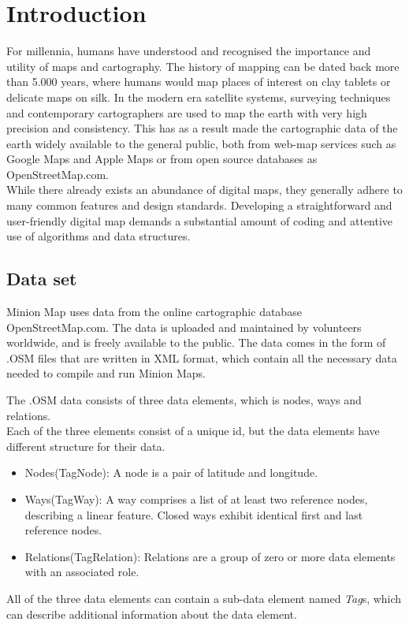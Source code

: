 \section{Introduction}
For millennia, humans have understood and recognised the importance and utility of maps and cartography. The history of mapping can be dated back more than 5.000 years, where humans would map places of interest on clay tablets or delicate maps on silk. In the modern era satellite systems, surveying techniques and contemporary cartographers are used to map the earth with very high precision and consistency. \cite*{littertur/icsm}
This has as a result made the cartographic data of the earth widely available to the general public, both from web-map services such as Google Maps and Apple Maps or from open source databases as OpenStreetMap.com. \\
\linebreak
While there already exists an abundance of digital maps, they generally adhere to many common features and design standards. Developing a straightforward and user-friendly digital map demands a substantial amount of coding and attentive use of algorithms and data structures. 

\subsection{Data set} \label{DataSet}
Minion Map uses data from the online cartographic database OpenStreetMap.com. The data is uploaded and maintained by volunteers worldwide, and is freely available to the public.\cite*{osm} 
The data comes in the form of .OSM files that are written in XML format, which contain all the necessary data needed to compile and run Minion Maps.
\par	The .OSM data consists of three data elements, which is nodes, ways and relations.   
\\Each of the three elements consist of a unique id, but the data elements have different structure for their data.\cite*{osm/XMLReader-Writer}
\newpage
\begin{itemize}
    \item Nodes(TagNode): A node is a pair of latitude and longitude.
    \item Ways(TagWay): A way comprises a list of at least two reference nodes, describing a linear feature. Closed ways exhibit identical first and last reference nodes. 
    \item Relations(TagRelation): Relations are a group of zero or more data elements with an associated role. 
\end{itemize}
All of the three data elements can contain a sub-data element named \textit{Tag}s, which can describe additional information about the data element.  
